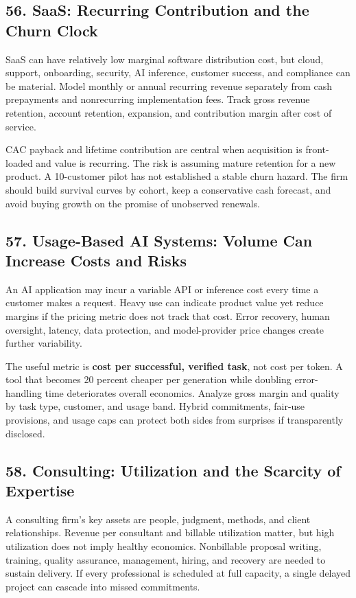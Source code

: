 \subsection*{56. SaaS: Recurring Contribution and the Churn Clock}

SaaS can have relatively low marginal software distribution cost, but cloud, support, onboarding, security, AI inference, customer success, and compliance can be material. Model monthly or annual recurring revenue separately from cash prepayments and nonrecurring implementation fees. Track gross revenue retention, account retention, expansion, and contribution margin after cost of service.

CAC payback and lifetime contribution are central when acquisition is front-loaded and value is recurring. The risk is assuming mature retention for a new product. A 10-customer pilot has not established a stable churn hazard. The firm should build survival curves by cohort, keep a conservative cash forecast, and avoid buying growth on the promise of unobserved renewals.

\subsection*{57. Usage-Based AI Systems: Volume Can Increase Costs and Risks}

An AI application may incur a variable API or inference cost every time a customer makes a request. Heavy use can indicate product value yet reduce margins if the pricing metric does not track that cost. Error recovery, human oversight, latency, data protection, and model-provider price changes create further variability.

The useful metric is \textbf{cost per successful, verified task}, not cost per token. A tool that becomes 20 percent cheaper per generation while doubling error-handling time deteriorates overall economics. Analyze gross margin and quality by task type, customer, and usage band. Hybrid commitments, fair-use provisions, and usage caps can protect both sides from surprises if transparently disclosed.

\subsection*{58. Consulting: Utilization and the Scarcity of Expertise}

A consulting firm's key assets are people, judgment, methods, and client relationships. Revenue per consultant and billable utilization matter, but high utilization does not imply healthy economics. Nonbillable proposal writing, training, quality assurance, management, hiring, and recovery are needed to sustain delivery. If every professional is scheduled at full capacity, a single delayed project can cascade into missed commitments.

